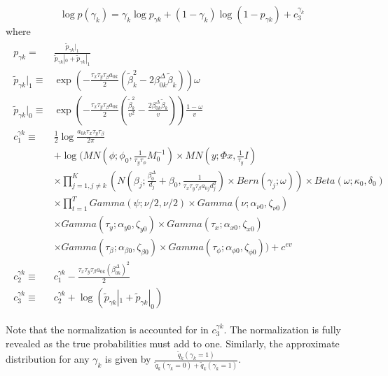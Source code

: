 \documentclass[11pt]{article}
\begin{document}
\begin{equation}
	\log p\left(\gamma_{k}\right) = \gamma_{k}\log p_{\gamma k}+\left(1-\gamma_{k}\right)\log\left(1-p_{\gamma k}\right)+c_{3}^{\gamma_{k}}
\end{equation}
where
\begin{align*}
\begin{split}
	p_{\gamma k}=&\frac{\tilde{p}_{\gamma k}|_{1}}{\tilde{p}_{\gamma k}|_{0}+\tilde{p}_{\gamma k}|_{1}}\\\tilde{p}_{\gamma k}|_{1}\equiv&\exp\left(-\frac{\tau_{x}\tau_{y}\tau_{\beta}a_{0k}}{2}\left(\tilde{\beta}_{k}^{2}-2\beta_{0k}^{\Delta}\tilde{\beta}_{k}\right)\right)\omega\\\tilde{p}_{\gamma k}|_{0}\equiv&\exp\left(-\frac{\tau_{x}\tau_{y}\tau_{\beta}a_{0k}}{2}\left(\frac{\tilde{\beta}_{k}^{2}}{v^{2}}-\frac{2\beta_{0k}^{\Delta}\tilde{\beta}_{k}}{v}\right)\right)\frac{1-\omega}{v}\\c_{1}^{\gamma k}\equiv&\frac{1}{2}\log\frac{a_{0k}\tau_{x}\tau_{y}\tau_{\beta}}{2\pi}\\&+\log\Bigg(MN\left(\phi;\phi_{0},\frac{1}{\tau_{y}\tau_{\phi}}M_{0}^{-1}\right)\times MN\left(y;\Phi x,\frac{1}{\tau_{y}}I\right)\\&\times\prod_{j=1,j\ne k}^{K}\left(N\left(\beta_{j};\frac{\beta_{0}^{\Delta}}{d_{j}}+\beta_{0},\frac{1}{\tau_{x}\tau_{y}\tau_{\beta}a_{0j}d_{j}^{2}}\right)\times Bern\left(\gamma_{j};\omega\right)\right)\times Beta\left(\omega;\kappa_{0},\delta_{0}\right)\\&\times\prod_{t=1}^{T}Gamma\left(\psi;\nu/2,\nu/2\right)\times Gamma\left(\nu;\alpha_{\nu0},\zeta_{\nu0}\right)\\&\times Gamma\left(\tau_{y};\alpha_{y0},\zeta_{y0}\right)\times Gamma\left(\tau_{x};\alpha_{x0},\zeta_{x0}\right)\\&\times Gamma\left(\tau_{\beta};\alpha_{\beta0},\zeta_{\beta0}\right)\times Gamma\left(\tau_{\phi};\alpha_{\phi0},\zeta_{\phi0}\right)\Bigg)+c^{ev}\\c_{2}^{\gamma k}\equiv&c_{1}^{\gamma k}-\frac{\tau_{x}\tau_{y}\tau_{\beta}a_{0k}\left(\beta_{0k}^{\Delta}\right)^{2}}{2}\\c_{3}^{\gamma k}\equiv&c_{2}^{\gamma k}+\log\left(\tilde{p}_{\gamma k}|_{1}+\tilde{p}_{\gamma k}|_{0}\right)
\end{split}
\end{align*}

Note that the normalization is accounted for in $c_{3}^{\gamma k}$. The normalization is fully revealed as the true probabilities must add to one. Similarly, the approximate distribution for any $\gamma_{k}$ is given by $\frac{\tilde{q}_{k}\left(\gamma_{k}=1\right)}{\tilde{q}_{k}\left(\gamma_{k}=0\right)+\tilde{q}_{k}\left(\gamma_{k}=1\right)}$. \\
\end{document}
